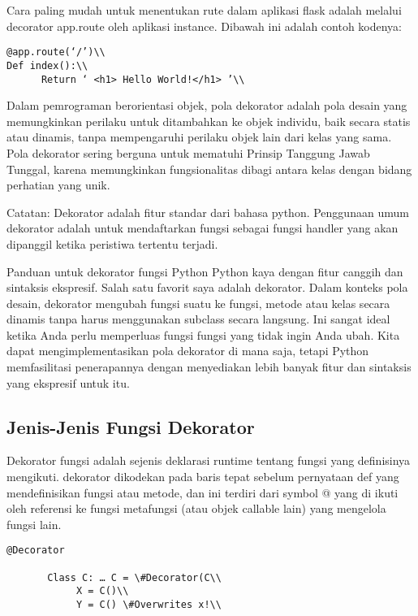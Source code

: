 \documentclass[12pt,a4paper]{article}
\begin{document}
Cara paling mudah untuk menentukan rute dalam aplikasi flask adalah melalui decorator app.route oleh aplikasi instance. Dibawah ini adalah contoh kodenya:\\
\begin{verbatim}
@app.route(‘/’)\\
Def index():\\
      Return ‘ <h1> Hello World!</h1> ’\\
\end{verbatim}

Dalam pemrograman berorientasi objek, pola dekorator adalah pola desain yang memungkinkan perilaku untuk ditambahkan ke objek individu, baik secara statis atau dinamis, tanpa mempengaruhi perilaku objek lain dari kelas yang sama. Pola dekorator sering berguna untuk mematuhi Prinsip Tanggung Jawab Tunggal, karena memungkinkan fungsionalitas dibagi antara kelas dengan bidang perhatian yang unik.

Catatan:
Dekorator adalah fitur standar dari bahasa python. Penggunaan umum dekorator adalah untuk mendaftarkan fungsi sebagai fungsi handler yang akan dipanggil ketika peristiwa tertentu terjadi.

Panduan untuk dekorator fungsi Python
Python kaya dengan fitur canggih dan sintaksis ekspresif. Salah satu favorit saya adalah dekorator. Dalam konteks pola desain, dekorator mengubah fungsi suatu ke fungsi, metode atau kelas secara dinamis tanpa harus menggunakan subclass secara langsung. Ini sangat ideal ketika Anda perlu memperluas fungsi fungsi yang tidak ingin Anda ubah. Kita dapat mengimplementasikan pola dekorator di mana saja, tetapi Python memfasilitasi penerapannya dengan menyediakan lebih banyak fitur dan sintaksis yang ekspresif untuk itu.

\subsection{Jenis-Jenis Fungsi Dekorator}


Dekorator fungsi adalah sejenis deklarasi runtime tentang fungsi yang definisinya mengikuti. dekorator dikodekan pada baris tepat sebelum pernyataan def yang mendefinisikan fungsi atau metode, dan ini terdiri dari symbol @ yang di ikuti oleh referensi ke fungsi metafungsi (atau objek callable lain) yang mengelola fungsi lain.


\begin{verbatim}
@Decorator

       Class C: … C = \#Decorator(C\\
            X = C()\\
            Y = C() \#Overwrites x!\\
\end{verbatim}
            
\end{document}
